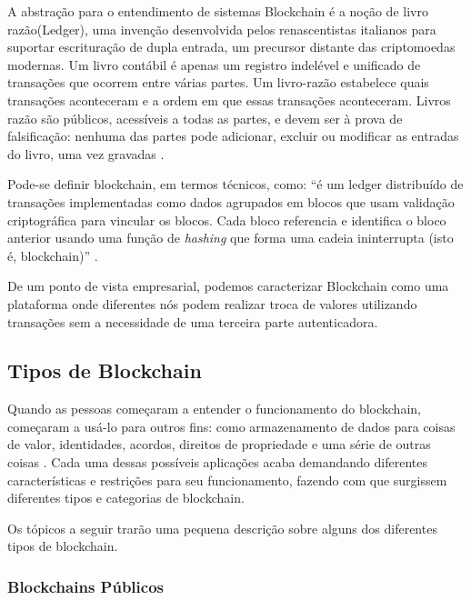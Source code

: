     A abstração para o entendimento de sistemas Blockchain é a noção de livro razão(Ledger), uma invenção desenvolvida pelos renascentistas italianos para suportar escrituração de dupla entrada, um precursor distante das criptomoedas modernas. Um livro contábil é apenas um registro indelével e unificado de transações que ocorrem entre várias partes. Um livro-razão estabelece quais transações aconteceram e a ordem em que essas transações aconteceram. Livros razão são públicos, acessíveis a todas as partes, e devem ser à prova de falsificação: nenhuma das partes pode adicionar, excluir ou modificar as entradas do livro, uma vez gravadas \cite{blockchain_computing_perspective}.
    
    Pode-se definir blockchain, em termos técnicos, como: “é um ledger distribuído de transações implementadas como dados agrupados em blocos que usam validação criptográfica para vincular os blocos. Cada bloco referencia e identifica o bloco anterior usando uma função de \textit{hashing} que forma uma cadeia ininterrupta (isto é, blockchain)” \cite{blockchain_pratical_guide}.
    
    De um ponto de vista empresarial, podemos caracterizar Blockchain como uma plataforma onde diferentes nós podem realizar troca de valores utilizando transações sem a necessidade de uma terceira parte autenticadora.
    
    
    \subsection{Tipos de Blockchain}
    \label{subsection_tipos_blockchain}

    Quando as pessoas começaram a entender o funcionamento do blockchain, começaram a usá-lo para outros fins: como armazenamento de dados para coisas de valor, identidades, acordos, direitos de propriedade e uma série de outras coisas \cite{blockchain_pratical_guide}. Cada uma dessas possíveis aplicações acaba demandando diferentes características e restrições para seu funcionamento, fazendo com que surgissem diferentes tipos e categorias de blockchain.
    
    Os tópicos a seguir trarão uma pequena descrição sobre alguns dos diferentes tipos de blockchain.
    
    
    \subsubsection{Blockchains Públicos}
    

